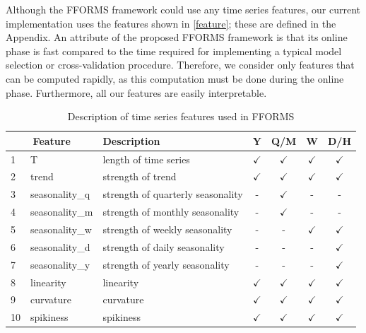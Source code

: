 \documentclass[11pt,a4paper,]{article}
\def\yes{$\checkmark$}
\begin{document}
Although the FFORMS framework could use any time series features, our current implementation uses the features shown in \autoref{feature}; these are defined in the Appendix. An attribute of the proposed FFORMS framework is that its online phase is fast compared to the time required for implementing a typical model selection or cross-validation procedure. Therefore, we consider only features that can be computed rapidly, as this computation must be done during the online phase. Furthermore, all our features are easily interpretable.

\begin{table}[!htp]
\centering\footnotesize\tabcolsep=0.12cm
\caption{Description of time series features used in FFORMS}
\label{feature}
\begin{tabular}{llp{}cccc}
\toprule
\multicolumn{2}{c}{Feature} & Description & Y & Q/M & W & D/H\\
\midrule
1  & T              & length of time series                                                                   & \yes  & \yes & \yes & \yes\\
2  & trend          & strength of trend                                                                       & \yes  & \yes & \yes & \yes\\
3  & seasonality\_q    & strength of quarterly seasonality                                                    & -     & \yes & - & -\\
4  & seasonality\_m    & strength of monthly seasonality                                                      & -     & \yes & - & -\\
5  & seasonality\_w    & strength of weekly seasonality                                                       & -     & - & \yes & \yes \\
6  & seasonality\_d    & strength of daily seasonality                                                        & -     & - & - & \yes\\
7  & seasonality\_y    & strength of yearly seasonality                                                       & -     & - & - & \yes\\
8  & linearity      & linearity                                                                               & \yes  & \yes & \yes & \yes\\
9  & curvature      & curvature                                                                               & \yes  & \yes & \yes & \yes\\
10  & spikiness      & spikiness                                                                               & \yes  & \yes & \yes & \yes\\

\end{tabular}
\end{table}
\end{document}
